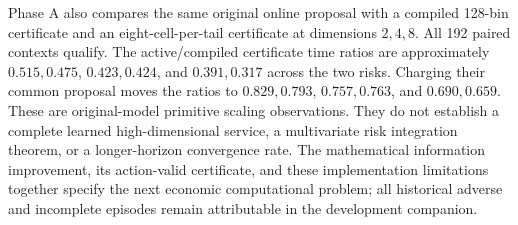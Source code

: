 Phase A also compares the same original online proposal with a compiled
128-bin certificate and an eight-cell-per-tail certificate at dimensions
$2,4,8$.  All 192 paired contexts qualify.  The active/compiled certificate
time ratios are approximately $0.515,0.475$, $0.423,0.424$, and
$0.391,0.317$ across the two risks.  Charging their common proposal moves
the ratios to $0.829,0.793$, $0.757,0.763$, and $0.690,0.659$.
These are original-model primitive scaling observations.  They do not
establish a complete learned high-dimensional service, a multivariate
risk integration theorem, or a longer-horizon convergence rate.  The
mathematical information improvement, its action-valid certificate, and
these implementation limitations together specify the next economic
computational problem; all historical adverse and incomplete episodes
remain attributable in the development companion.
